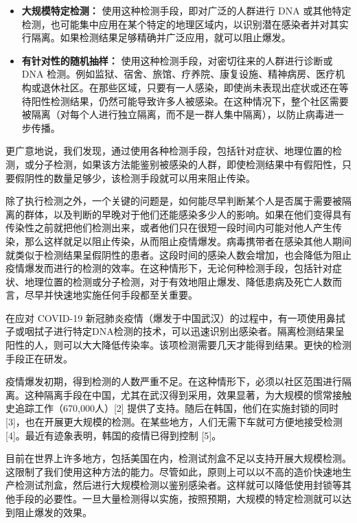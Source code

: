 \documentclass[onecolumn,journal]{IEEEtran}
\begin{document}
\begin{multicols}{2}
\begin{itemize}
  \item \textbf{大规模特定检测：} 使用这种检测手段，即对广泛的人群进行 DNA 或其他特定检测，也可能集中应用在某个特定的地理区域内，以识别潜在感染者并对其实行隔离。如果检测结果足够精确并广泛应用，就可以阻止爆发。

  \item \textbf{有针对性的随机抽样：} 使用这种检测手段，对密切往来的人群进行诊断或 DNA 检测。例如监狱、宿舍、旅馆、疗养院、康复设施、精神病房、医疗机构或退休社区。在那些区域，只要有一人感染，即使尚未表现出症状或还在等待阳性检测结果，仍然可能导致许多人被感染。在这种情况下，整个社区需要被隔离（对每个人进行独立隔离，而不是一群人集中隔离），以防止病毒进一步传播。


\end{itemize}

更广意地说，我们发现，通过使用各种检测手段，包括针对症状、地理位置的检测，或分子检测，如果该方法能鉴别被感染的人群，即使检测结果中有假阳性，只要假阴性的数量足够少，该检测手段就可以用来阻止传染。

除了执行检测之外，一个关键的问题是，如何能尽早判断某个人是否属于需要被隔离的群体，以及判断的早晚对于他们还能感染多少人的影响。如果在他们变得具有传染性之前就把他们检测出来，或者他们只在很短一段时间内可能对他人产生传染，那么这样就足以阻止传染，从而阻止疫情爆发。病毒携带者在感染其他人期间就类似于检测结果呈假阴性的患者。这段时间的感染人数会增加，也会降低为阻止疫情爆发而进行的检测的效率。在这种情形下，无论何种检测手段，包括针对症状、地理位置的检测或分子检测，对于有效地阻止爆发、降低患病及死亡人数而言，尽早并快速地实施任何手段都至关重要。

在应对 COVID-19 新冠肺炎疫情（爆发于中国武汉）的过程中，有一项使用鼻拭子或咽拭子进行特定DNA检测的技术，可以迅速识别出感染者。隔离检测结果呈阳性的人，则可以大大降低传染率。该项检测需要几天才能得到结果。更快的检测手段正在研发。

疫情爆发初期，得到检测的人数严重不足。在这种情形下，必须以社区范围进行隔离。这种隔离手段在中国，尤其在武汉得到采用，效果显著，为大规模的惯常接触史追踪工作（670,000人）[2] 提供了支持。随后在韩国，他们在实施封锁的同时 [3]，也在开展更大规模的检测。在某些地方，人们无需下车就可方便地接受检测 [4]。最近有迹象表明，韩国的疫情已得到控制 [5]。

目前在世界上许多地方，包括美国在内，检测试剂盒不足以支持开展大规模检测。这限制了我们使用这种方法的能力。尽管如此，原则上可以以不高的造价快速地生产检测试剂盒，然后进行大规模检测以鉴别感染者。这样就可以降低使用封锁等其他手段的必要性。一旦大量检测得以实施，按照预期，大规模的特定检测就可以达到阻止爆发的效果。


\end{multicols}
\end{document}
